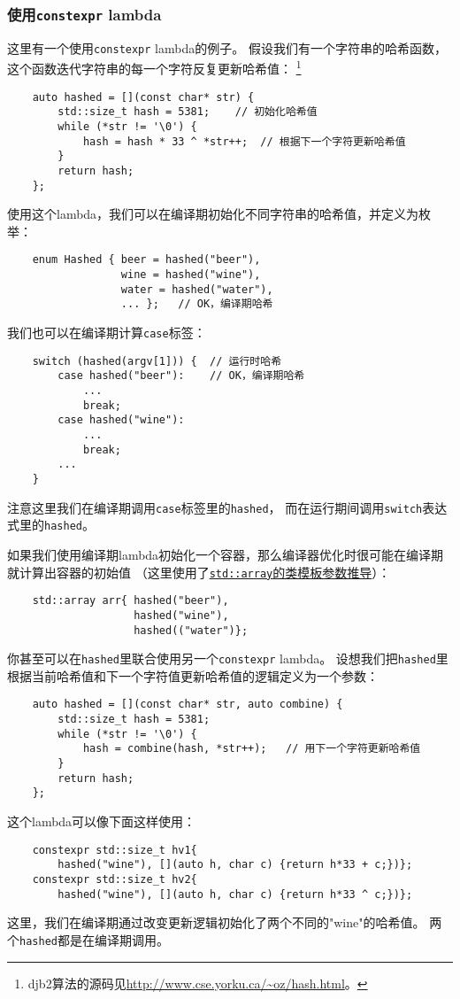 \subsubsection{使用\texttt{constexpr} lambda}
这里有一个使用\texttt{constexpr} lambda的例子。
假设我们有一个字符串的哈希函数，这个函数迭代字符串的每一个字符反复更新哈希值：
\footnote{djb2算法的源码见\url{http://www.cse.yorku.ca/~oz/hash.html}。}
\begin{lstlisting}
    auto hashed = [](const char* str) {
        std::size_t hash = 5381;    // 初始化哈希值
        while (*str != '\0') {
            hash = hash * 33 ^ *str++;  // 根据下一个字符更新哈希值
        }
        return hash;
    };
\end{lstlisting}
使用这个lambda，我们可以在编译期初始化不同字符串的哈希值，并定义为枚举：
\begin{lstlisting}
    enum Hashed { beer = hashed("beer"),
                  wine = hashed("wine"),
                  water = hashed("water"),
                  ... };   // OK，编译期哈希
\end{lstlisting}
我们也可以在编译期计算\texttt{case}标签：
\begin{lstlisting}
    switch (hashed(argv[1])) {  // 运行时哈希
        case hashed("beer"):    // OK，编译期哈希
            ...
            break;
        case hashed("wine"):
            ...
            break;
        ...
    }
\end{lstlisting}
注意这里我们在编译期调用\texttt{case}标签里的\texttt{hashed}，
而在运行期间调用\texttt{switch}表达式里的\texttt{hashed}。

如果我们使用编译期lambda初始化一个容器，那么编译器优化时很可能在编译期就计算出容器的初始值
（这里使用了\hyperref[ch9.2.6.3]{\texttt{std::array}的类模板参数推导}）：
\begin{lstlisting}
    std::array arr{ hashed("beer"),
                    hashed("wine"),
                    hashed(("water")};
\end{lstlisting}
你甚至可以在\texttt{hashed}里联合使用另一个\texttt{constexpr} lambda。
设想我们把\texttt{hashed}里根据当前哈希值和下一个字符值更新哈希值的逻辑定义为一个参数：
\begin{lstlisting}
    auto hashed = [](const char* str, auto combine) {
        std::size_t hash = 5381;
        while (*str != '\0') {
            hash = combine(hash, *str++);   // 用下一个字符更新哈希值
        }
        return hash;
    };
\end{lstlisting}
这个lambda可以像下面这样使用：
\begin{lstlisting}
    constexpr std::size_t hv1{
        hashed("wine"), [](auto h, char c) {return h*33 + c;})};
    constexpr std::size_t hv2{
        hashed("wine"), [](auto h, char c) {return h*33 ^ c;})};
\end{lstlisting}
这里，我们在编译期通过改变更新逻辑初始化了两个不同的"wine"的哈希值。
两个\texttt{hashed}都是在编译期调用。

